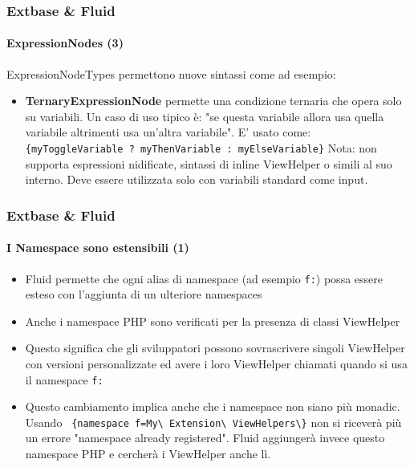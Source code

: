 \begin{frame}[fragile]
	\frametitle{Extbase \& Fluid}
	\framesubtitle{ExpressionNodes (3)}

	ExpressionNodeTypes permettono nuove sintassi come ad esempio:

	\begin{itemize}

		\item \textbf{TernaryExpressionNode}\newline
			\small
				permette una condizione ternaria che opera solo su variabili.
				Un caso di uso tipico è: "se questa variabile allora usa quella variabile altrimenti usa
				un'altra variabile". E' usato come:\newline
				\texttt{\{myToggleVariable ? myThenVariable : myElseVariable\}}\newline
				Nota: non supporta espressioni nidificate, sintassi di inline ViewHelper
				o simili al suo interno. Deve essere utilizzata solo con variabili standard
				come input.
			\normalsize

	\end{itemize}

\end{frame}


\begin{frame}[fragile]
	\frametitle{Extbase \& Fluid}
	\framesubtitle{I Namespace sono estensibili (1)}

	\begin{itemize}

		\item Fluid permette che ogni alias di namespace (ad esempio \texttt{f:}) possa
			essere esteso con l'aggiunta di un ulteriore namespaces

		\item Anche i namespace PHP sono verificati per la presenza di classi ViewHelper

		\item Questo significa che gli sviluppatori possono sovrascrivere singoli ViewHelper
			con versioni personalizzate ed avere i loro ViewHelper chiamati quando si usa
			il namespace \texttt{f:} 

		\item Questo cambiamento implica anche che i namespace non siano più monadic.
			Usando
			\texttt{
				\{namespace f=My\textbackslash
				Extension\textbackslash
				ViewHelpers\textbackslash\}}\newline
				non si riceverà più un errore "namespace already registered".
				Fluid aggiungerà invece questo namespace PHP e cercherà i ViewHelper
				anche lì.

	\end{itemize}

\end{frame}


